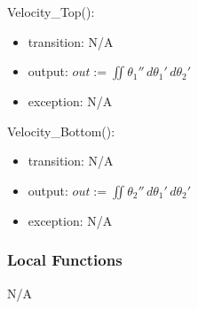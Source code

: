 \documentclass[12pt, titlepage]{article}
\begin{document}
\noindent Velocity\_Top():
\begin{itemize}
\item transition: N/A 
\item output: $out:= $$\iint {\theta_1}'' \,d{\theta_1}'\,d{\theta_2}'$$ $
\item exception: N/A
\end{itemize}

\noindent Velocity\_Bottom():
\begin{itemize}
\item transition: N/A 
\item output: $out:= $$\iint {\theta_2}'' \,d{\theta_1}'\,d{\theta_2}'$$ $
\item exception: N/A
\end{itemize}

\subsubsection{Local Functions}

N/A
\newpage
\end{document}
